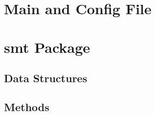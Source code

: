 
\section{Main and Config File}
\label{sec:main-file}

\section{\acs{smt} Package}
\label{sec:smt-package}

\subsection{Data Structures}
\label{sec:data-structures}

\subsection{Methods}
\label{sec:methods}

